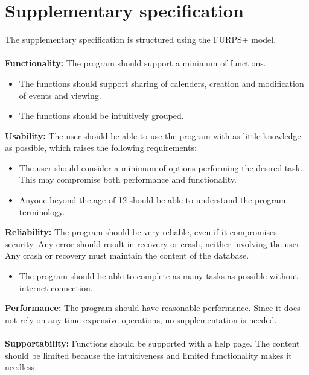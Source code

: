 \documentclass[a4paper,10pt,titlepage]{article}
\begin{document}
\section{Supplementary specification}
	The supplementary specification is structured using the FURPS+ model.
	\\ \\
	\textbf{Functionality:}
	The program should support a minimum of functions.
	\begin{itemize}
	\item The functions should support sharing of calenders, creation and modification of events and viewing.
	\item The functions should be intuitively grouped.
	\\
	\end{itemize}
	\textbf{Usability:}
	The user should be able to use the program with as little knowledge as possible, which raises the following requirements:
	\begin{itemize}
	\item The user should consider a minimum of options performing the desired task. This may compromise both performance and functionality.
	\item Anyone beyond the age of 12 should be able to understand the program terminology. 
	\\
	\end{itemize}
	\textbf{Reliability:}
	The program should be very reliable, even if it compromises security. Any error should result in recovery or crash, neither involving the user. Any crash or recovery must maintain the content of the database.
	\begin{itemize}
	\item The program should be able to complete as many tasks as possible without internet connection.
	\\
	\end{itemize}
	\textbf{Performance:}
	The program should have reasonable performance. Since it does not rely on any time expensive operations, no supplementation is needed.
	\\ \\
	\textbf{Supportability:}
	Functions should be supported with a help page. The content should be limited because the intuitiveness and limited functionality makes it needless.
	\\



	
	
	
	
\end{document}
